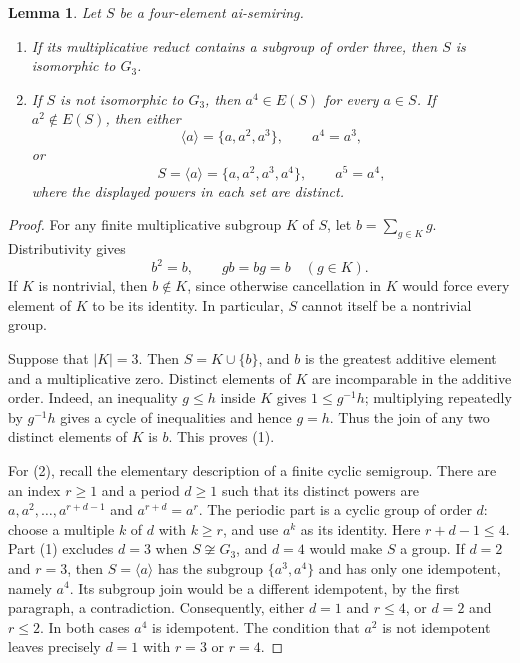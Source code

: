 \documentclass[11pt,reqno]{amsart}
\newtheorem{lemma}[theorem]{Lemma}
\theoremstyle{remark}
\numberwithin{equation}{section}
\begin{document}
\begin{lemma}\label{lem:small-powers}
Let $S$ be a four-element ai-semiring.
\begin{enumerate}
\item If its multiplicative reduct contains a subgroup of order three,
then $S$ is isomorphic to $G_3$.
\item If $S$ is not isomorphic to $G_3$, then $a^4\in E(S)$ for every
$a\in S$. If $a^2\notin E(S)$, then either
\[
\langle a\rangle=\{a,a^2,a^3\},\qquad a^4=a^3,
\]
or
\[
S=\langle a\rangle=\{a,a^2,a^3,a^4\},\qquad a^5=a^4,
\]
where the displayed powers in each set are distinct.
\end{enumerate}
\end{lemma}
\begin{proof}
For any finite multiplicative subgroup $K$ of $S$, let $b=\sum_{g\in K}g$.
Distributivity gives
\[
b^2=b,\qquad gb=bg=b\quad(g\in K).
\]
If $K$ is nontrivial, then $b\notin K$, since otherwise cancellation in
$K$ would force every element of $K$ to be its identity. In particular,
$S$ cannot itself be a nontrivial group.

Suppose that $|K|=3$. Then $S=K\cup\{b\}$, and $b$ is the greatest
additive element and a multiplicative zero. Distinct elements of $K$
are incomparable in the additive order. Indeed, an inequality $g\leq h$
inside $K$ gives $1\leq g^{-1}h$; multiplying repeatedly by $g^{-1}h$
gives a cycle of inequalities and hence $g=h$. Thus the join of any two
distinct elements of $K$ is $b$. This proves (1).

For (2), recall the elementary description of a finite cyclic semigroup.
There are an index $r\geq1$ and a period $d\geq1$ such that its distinct
powers are $a,a^2,\ldots,a^{r+d-1}$ and $a^{r+d}=a^r$.
The periodic part is a cyclic group of order $d$: choose a multiple $k$
of $d$ with $k\geq r$, and use $a^k$ as its identity. Here
$r+d-1\leq4$. Part (1) excludes $d=3$ when $S\not\cong G_3$, and
$d=4$ would make $S$ a group. If $d=2$ and $r=3$, then $S=\langle a\rangle$
has the subgroup $\{a^3,a^4\}$ and has only one idempotent, namely $a^4$.
Its subgroup join would be a different idempotent, by the first paragraph,
a contradiction. Consequently, either $d=1$ and $r\leq4$, or $d=2$ and
$r\leq2$. In both cases $a^4$ is idempotent. The condition that $a^2$
is not idempotent leaves precisely $d=1$ with $r=3$ or $r=4$.
\end{proof}
\end{document}
